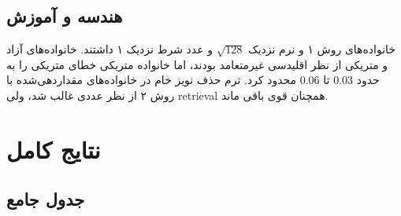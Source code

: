 \documentclass[a4paper,12pt]{article}
\begin{document}
\subsection{هندسه و آموزش}
خانواده‌های روش ۱ و  نرم نزدیک $\sqrt{128}$ و عدد شرط نزدیک ۱ داشتند. خانواده‌های آزاد و متریکی از نظر اقلیدسی غیرمتعامد بودند، اما خانواده متریکی خطای متریکی را به حدود $0.03$ تا $0.06$ محدود کرد. ترم حذف نویز خام در خانواده‌های مقداردهی‌شده با روش ۲ از نظر عددی غالب شد، ولی retrieval همچنان قوی باقی ماند.

\section{نتایج کامل }
\subsection{جدول جامع}
\end{document}
